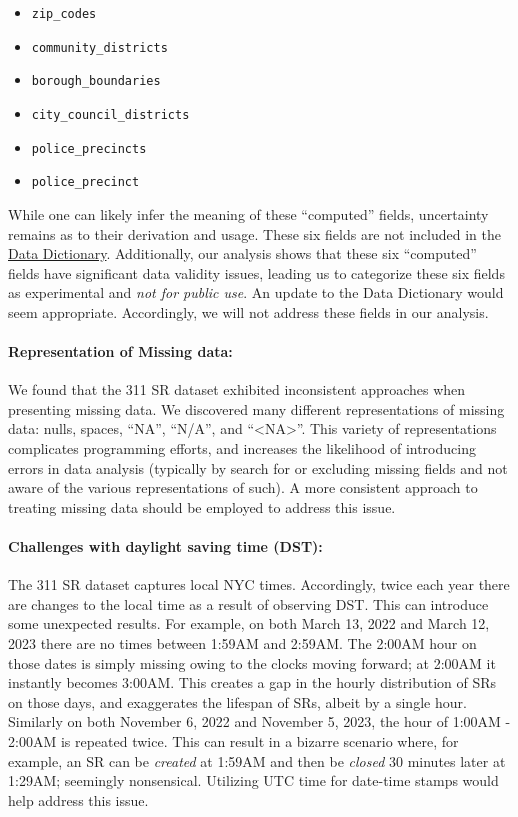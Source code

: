\documentclass[linenumber]{jdsart}
\begin{document}
\begin{itemize}[left=1.5em]
    \item \texttt{zip\_codes}
    \item \texttt{community\_districts}
    \item \texttt{borough\_boundaries}
    \item \texttt{city\_council\_districts}
    \item \texttt{police\_precincts}
    \item \texttt{police\_precinct}
\end{itemize}

While one can likely infer the meaning of these ``computed'' 
fields, uncertainty remains as to their derivation and 
usage. These six fields are not included in
the \href{https://data.cityofnewyork.us/api/views/erm2-nwe9/files/b372b884-f86a-453b-ba16-1fe06ce9d212?download=true&filename=311_ServiceRequest_2010-Present_DataDictionary_Updated_2023.xlsx}{Data Dictionary}. Additionally, 
our analysis shows that these six ``computed'' fields have 
significant data validity issues, leading us to categorize these six fields 
as experimental and \textit{not for public use}. An update 
to the Data Dictionary would seem appropriate. Accordingly, 
we will not address these fields in our analysis. 

\paragraph{Representation of Missing data:} We found that the 
311 SR dataset exhibited inconsistent approaches when 
presenting missing data. We discovered many different 
representations of missing data: nulls, spaces, ``NA'', ``N/A'', 
and ``<NA>''. This variety of representations complicates programming
efforts, and increases the likelihood of introducing errors 
in data analysis (typically by search for or excluding missing fields 
and not aware of the various representations of such). A more consistent 
approach to treating missing data should be employed to address this issue.

\paragraph{Challenges with daylight saving time (DST):} The 311 SR 
dataset captures local NYC times. Accordingly, twice each 
year there are changes to the local time as a result of observing 
DST. This can introduce some unexpected results. For example, 
on both March 13, 2022 and March 12, 2023 there are no times 
between 1:59AM and 2:59AM. The 2:00AM hour on those dates 
is simply missing owing to the clocks moving forward; at 2:00AM 
it instantly becomes 3:00AM. This creates a gap in the hourly 
distribution of SRs on those days, and exaggerates the 
lifespan of SRs, albeit by a single hour. Similarly on both
November 6, 2022 and November 5, 2023, the 
hour of 1:00AM - 2:00AM is repeated twice. This can result 
in a bizarre scenario where, for example, an SR can 
be \textit{created} at 1:59AM and then be \textit{closed} 30 minutes later 
at 1:29AM; seemingly nonsensical. Utilizing UTC time 
for date\mbox{-}time stamps would help address this issue.
\end{document}
